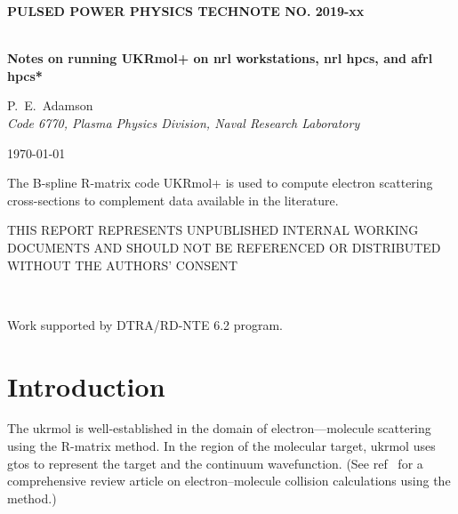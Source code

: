 \documentclass[12pt]{article}
\begin{document}


\graphicspath{{./fig/}}
\begin{titlepage}

\rmfamily
\begin{center}\sffamily\bfseries
PULSED POWER PHYSICS TECHNOTE NO. 2019-xx\\
{~}
\end{center}

\begin{description}[leftmargin=8em,style=nextline,font=\sffamily\bfseries ]
\item[TITLE:]{\bfseries 
		Notes on running UKRmol+ on \ac{nrl} workstations, \ac{nrl} \acp{hpc}, and \ac{afrl} \acp{hpc}*
}
\item[AUTHORS:]{ P.~E.~Adamson\\
{\itshape Code 6770, Plasma Physics Division, Naval Research Laboratory}}
\item[DATE:]\today
\item[ABSTRACT:] 
		The B-spline R-matrix code UKRmol+\cite{Carr2012} is used to compute electron scattering cross-sections 
		to complement data available in the literature.
\end{description}

\vfill

{\small
\noindent THIS REPORT REPRESENTS UNPUBLISHED INTERNAL WORKING DOCUMENTS AND SHOULD NOT BE REFERENCED OR DISTRIBUTED WITHOUT THE AUTHORS' CONSENT

{~}

\noindent * Work supported by DTRA/RD-NTE 6.2 program.
}
\end{titlepage}

\pagestyle{myheadings}

\section{Introduction}


The \ac{ukrmol}\cite{Carr2012} is well-established in the domain of electron—molecule 
scattering using the R-matrix method. 
In the region of the molecular target, \ac{ukrmol} uses \acp{gto} to represent 
the target and the continuum wavefunction. 
(See ref~\cite{TENNYSON201029} for a comprehensive review article on electron–molecule 
collision calculations using the \rmat{} method.) 

\end{document}
